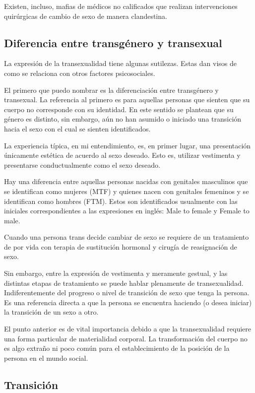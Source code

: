 Existen, incluso, mafias de médicos no calificados que realizan intervenciones
quirúrgicas de cambio de sexo de manera clandestina.

\subsection{Diferencia entre transgénero y transexual}

La expresión de la transexualidad tiene algunas sutilezas. Estas dan visos de
como se relaciona con otros factores psicosociales.

El primero que puedo nombrar es la diferenciación entre transgénero y
transexual.  La referencia al primero es para aquellas personas que sienten que
su cuerpo no corresponde con su identidad. En este sentido se plantean que su
género es distinto, sin embargo, aún no han asumido o iniciado una transición
hacia el sexo con el cual se sienten identificados.

La experiencia típica, en mi entendimiento, es, en primer lugar, una
presentación únicamente estética de acuerdo al sexo deseado. Esto es, utilizar
vestimenta y presentarse conductualmente como el sexo deseado.

Hay una diferencia entre aquellas personas nacidas con genitales masculinos que
se identifican como mujeres (MTF) y quienes nacen con genitales femeninos y se
identifican como hombres (FTM). Estos son identificados usualmente con las
iniciales correspondientes a las expresiones en inglés: Male to female y Female
to male.

Cuando una persona trans decide cambiar de sexo se requiere de un tratamiento de
por vida con terapia de sustitución hormonal y cirugía de reasignación de sexo.

Sin embargo, entre la expresión de vestimenta y meramente gestual, y las
distintas etapas de tratamiento se puede hablar plenamente de transexualidad.
Indiferentemente del progreso o nivel de transición de sexo que tenga la
persona. Es una referencia directa a que la persona se encuentra haciendo (o
desea iniciar) la transición de un sexo a otro.

El punto anterior es de vital importancia debido a que la transexualidad
requiere una forma particular de materialidad corporal. La transformación del
cuerpo no es algo extraño ni poco común para el establecimiento de la posición
de la persona en el mundo social.

\subsection{Transición}

